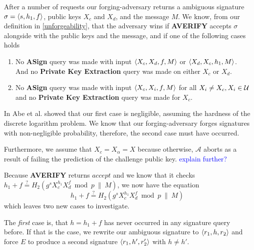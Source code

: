 After a number of requests our forging-adversary returns a ambiguous signature \(\sigma = \langle s,h_1, f \rangle\), public keys \(X_c\) and \(X_d\), and the message \(M\).
We know, from our definition in \ref{unforgeability}, that the adversary wins if \textbf{AVERIFY} accepts \(\sigma\) alongside with the public keys and the message, and if one of the following cases holds
  \begin{enumerate}
    \item No \textbf{ASign} query was made with input \(\langle X_c, X_d, f, M \rangle\) or \(\langle X_d, X_c, h_1, M \rangle\).
          And no \textbf{Private Key Extraction} query was made on either \(X_c\) or \(X_d\).
    \item No \textbf{ASign} query was made with input \(\langle X_c, X_i, f, M \rangle\) for all \(X_i \neq X_c, X_i\in\mathcal{U}\) and no \textbf{Private Key Extraction} query was made for \(X_c\).
  \end{enumerate}

In \cite{abe20021} Abe et al. showed that our first case is negligible, assuming the hardness of the discrete logarithm problem. 
We know that our forging-adversary forges signatures with non-negligible probability, therefore, the second case must have occurred.

Furthermore, we assume that \(X_c = X_\alpha = X\) because otherwise, \(\mathcal{A}\) aborts as a result of failing the prediction of the challenge public key.
\textcolor{blue}{explain further?} 

Because \textbf{AVERIFY} returns \(accept\) and we know that it checks \(h_1 + f \overset{?}{=} H_2(g^s X_{c}^{h_1} X_d^f \bmod p ~\|~ M)\), we now have the equation
\[h_1 + f \overset{?}{=} H_2(g^s X_{c}^{h_1} X_d^f \bmod p ~\|~ M)\]
which leaves two new cases to investigate.

The \textit{first} case is, that \(h = h_1 + f\) has never occurred in any signature query before.
If that is the case, we rewrite our ambiguous signature to \(\langle r_1, h, r_2 \rangle\) and force \(E\) to produce a second signature \(\langle r_1, h', r_2' \rangle\) with \(h\neq h'\).

